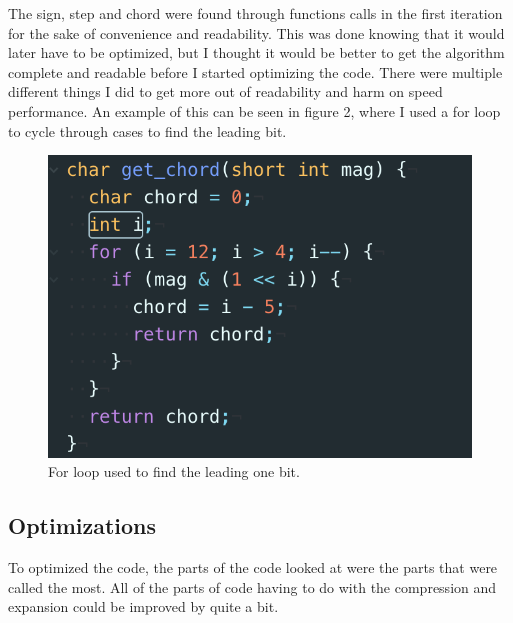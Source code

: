 \documentclass[12pt]{article}
\begin{document}
The sign, step and chord were found through functions calls in the first iteration for the sake of convenience and readability. This was done knowing that it would later have to be optimized, but I thought it would be better to get the algorithm complete and readable before I started optimizing the code. There were multiple different things I did to get more out of readability and harm on speed performance. An example of this can be seen in figure 2, where I used a for loop to cycle through cases to find the leading bit.\\

\begin{figure}[!h]
        \includegraphics[width=\textwidth ]
        {get_chord_for_loop.png}
        \caption{\label{fig:my-label} For loop used to find the leading one bit.}
\end{figure}
\subsection{Optimizations}

To optimized the code, the parts of the code looked at were the parts that were called the most. All of the parts of code having to do with the compression and expansion could be improved by quite a bit.
\newpage
\end{document}
